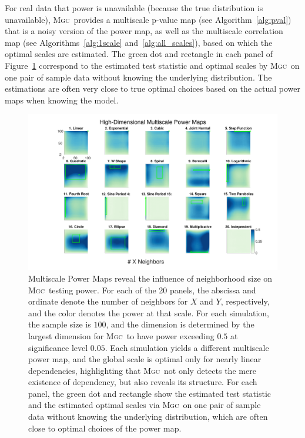 \documentclass[11pt]{article}
\providecommand{\sct}[1]{{\normalfont\textsc{#1}}}
\newcommand{\Mgc}{\sct{Mgc}}
\begin{document}
For real data that power is unavailable (because the true distribution is unavailable), \Mgc~provides a multiscale p-value map (see Algorithm~\ref{alg:pval}) that is a noisy version of the power map, as well as the multiscale correlation map (see Algorithms~\ref{alg:1scale} and~\ref{alg:all_scales}), based on which the optimal scales are estimated. The green dot and rectangle in each panel of Figure~\ref{f:powermaps} correspond to the estimated test statistic and optimal scales by \Mgc~on one pair of sample data without knowing the underlying distribution. The estimations are often very close to true optimal choices based on the actual power maps when knowing the model.

\begin{figure}[htbp]
\includegraphics[width=1.0\textwidth,trim={3cm 0.5cm 2.5cm 0.5cm},clip]{Figures/FigHDHeat}
\caption{Multiscale Power Maps reveal the influence of neighborhood size on \Mgc~testing power.
For each of the 20 panels, the abscissa and ordinate denote the number of neighbors for $X$ and  $Y$, respectively, and the color denotes the power at that scale. For each simulation, the sample size is $100$,  and the dimension is determined by the largest dimension for \Mgc~to have power exceeding $0.5$ at significance level $0.05$. Each simulation yields a different multiscale power map, and the global scale is optimal only for nearly linear dependencies, highlighting that \Mgc~not only detects the mere existence of dependency, but also reveals its  structure. 
For each panel, the green dot and rectangle show the estimated test statistic and the estimated optimal scales via \Mgc~on one pair of sample data without knowing the underlying distribution, which are often close to optimal choices of the power map.
}
\label{f:powermaps}
\end{figure}
\end{document}
